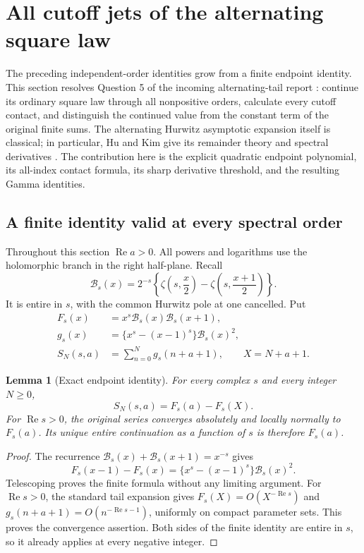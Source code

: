 \documentclass[11pt]{article}
\newtheorem{lemma}[theorem]{Lemma}
\theoremstyle{definition}
\theoremstyle{remark}
\numberwithin{equation}{section}
\newcommand{\Rea}{\operatorname{Re}}
\begin{document}
\section{All cutoff jets of the alternating square law}
\label{cut:sec}

The preceding independent-order identities grow from a finite endpoint
identity. This section resolves Question 5 of the incoming alternating-tail
report \cite{AlternatingIncoming}: continue its ordinary square law through
all nonpositive orders, calculate every cutoff contact, and distinguish the
continued value from the constant term of the original finite sums. The
alternating Hurwitz asymptotic expansion itself is classical; in particular,
Hu and Kim give its remainder theory and spectral derivatives
\cite{HuKimAsymptotic}. The contribution here is the explicit quadratic
endpoint polynomial, its all-index contact formula, its sharp derivative
threshold, and the resulting Gamma identities.

\subsection{A finite identity valid at every spectral order}

Throughout this section $\Rea a>0$. All powers and logarithms use the
holomorphic branch in the right half-plane. Recall
\begin{equation}\label{cut:B}
 \mathcal B_s(x)=2^{-s}\left\{\zeta\left(s,\frac{x}{2}\right)
                    -\zeta\left(s,\frac{x+1}{2}\right)\right\}.
\end{equation}
It is entire in $s$, with the common Hurwitz pole at one cancelled.
Put
\begin{align}
 F_s(x)&=x^s\mathcal B_s(x)\mathcal B_s(x+1),\label{cut:F}\\
 g_s(x)&=\{x^s-(x-1)^s\}\mathcal B_s(x)^2,\label{cut:g}\\
 S_N(s,a)&=\sum_{n=0}^{N}g_s(n+a+1),\qquad X=N+a+1.
 \label{cut:SN}
\end{align}

\begin{lemma}[Exact endpoint identity]\label{cut:finite}
For every complex $s$ and every integer $N\ge0$,
\begin{equation}\label{cut:finiteeq}
 S_N(s,a)=F_s(a)-F_s(X).
\end{equation}
For $\Rea s>0$, the original series converges absolutely and locally
normally to $F_s(a)$. Its unique entire continuation as a function of $s$
is therefore $F_s(a)$.
\end{lemma}
\begin{proof}
The recurrence
$\mathcal B_s(x)+\mathcal B_s(x+1)=x^{-s}$ gives
\[
 F_s(x-1)-F_s(x)
 =\{x^s-(x-1)^s\}\mathcal B_s(x)^2.
\]
Telescoping proves the finite formula without any limiting argument.
For $\Rea s>0$, the standard tail expansion gives
$F_s(X)=O(X^{-\Rea s})$ and
$g_s(n+a+1)=O(n^{-\Rea s-1})$, uniformly on compact parameter sets.
This proves the convergence assertion. Both sides of the finite identity
are entire in $s$, so it already applies at every negative integer.
\end{proof}
\end{document}
